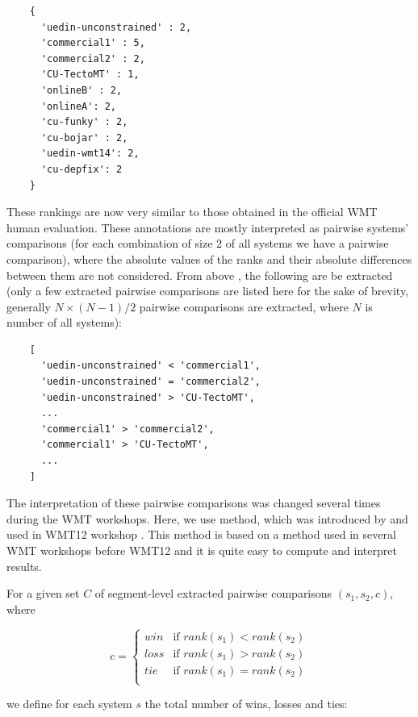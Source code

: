 \begin{verbatim}
    {
      'uedin-unconstrained' : 2,
      'commercial1' : 5,
      'commercial2' : 2,
      'CU-TectoMT' : 1,
      'onlineB' : 2,
      'onlineA': 2,
      'cu-funky' : 2,
      'cu-bojar' : 2,
      'uedin-wmt14': 2,
      'cu-depfix': 2
    }
\end{verbatim}

These rankings are now very similar to those obtained in the official WMT human
evaluation. These annotations are mostly interpreted as pairwise systems'
comparisons (for each combination of size 2 of all systems we have a pairwise
comparison), where the absolute values of the ranks and their absolute
differences between them are not considered. From above , the following  are be extracted (only
a few extracted pairwise comparisons are listed here for the sake of brevity,
generally $N \times (N-1) / 2$ pairwise comparisons are extracted, where $N$ is
number of all systems):

\begin{verbatim}
    [
      'uedin-unconstrained' < 'commercial1',
      'uedin-unconstrained' = 'commercial2',
      'uedin-unconstrained' > 'CU-TectoMT',
      ...
      'commercial1' > 'commercial2',
      'commercial1' > 'CU-TectoMT',
      ...
    ]
\end{verbatim}

The interpretation of these pairwise comparisons was changed several times
during the WMT workshops. Here, we use 
method, which was introduced by  and used in
WMT12 workshop . This method is based on a method
used in several WMT workshops before WMT12 and it is quite easy to compute and
interpret results.

For a given set $C$ of segment-level extracted pairwise comparisons
$(s_1,s_2,c)$, where 

\begin{equation*}
c = \begin{cases}
  win  & \text{if $rank(s_1) < rank(s_2)$} \\
  loss & \text{if $rank(s_1) > rank(s_2)$} \\
  tie  & \text{if $rank(s_1) = rank(s_2)$} \\
    \end{cases}
\end{equation*}

\noindent we define for each system $s$ the total number of wins, losses and ties:

